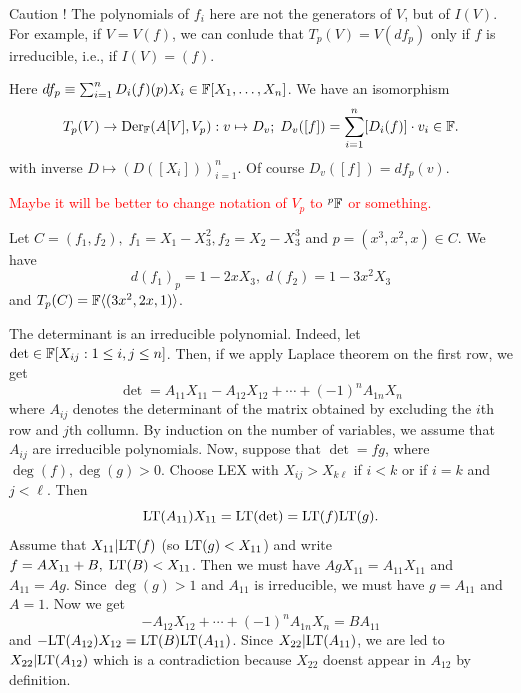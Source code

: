 \begin{itemize}
  \begin{remark}
    Caution ! The polynomials of $f_i$ here are not the generators of $V$, but of $I(V)$. For example, if 
    $V=V(f)$, we can conlude that $T_p(V) = V(df_p)$ only if $f$ is irreducible, i.e., if $I(V)=(f)$.
  \end{remark}
  Here $df_p\equiv \sum_{i=1}^nD_i(f)(p)X_i\in\mathbb{F}[X_1,\dots,X_n]$. We have an isomorphism
  \begin{equation}
    T_p(V)\rightarrow \text{Der}_{\mathbb{F}}(A[V],V_p):v\mapsto D_v;\;D_v([f])=\sum_{i=1}^n[D_i(f)]\cdot v_i\in\mathbb{F}.
  \end{equation}
  with inverse $D\mapsto (D([X_i]))_{i=1}^n$. Of course $D_v([f])=df_p(v)$.
  \begin{center}
    \textcolor{red}{Maybe it will be better to change notation of $V_p$ to $\prescript{p}{}{}\mathbb{F}$ or something.}
  \end{center}
  \begin{example}
    Let $C=(f_1,f_2),\;f_1=X_1-X_3^2, f_2=X_2-X_3^3$ and $p=(x^3,x^2,x)\in C$. We have 
    \begin{equation}
        d(f_1)_p = 1 - 2x X_3,\;d(f_2) = 1 - 3x^2 X_3 
    \end{equation}
    and $T_p(C)=\mathbb{F}\langle(3x^2,2x,1)\rangle$.
  \end{example} 

  \begin{example}
    The determinant is an irreducible polynomial. Indeed, let $\det\in\mathbb{F}[X_{ij}:1\leq i,j\leq n]$. Then, if we apply Laplace theorem
    on the first row, we get 
    \begin{equation}
        \det = A_{11} X_{11} - A_{12}X_{12} +\cdots+(-1)^nA_{1n}X_n
    \end{equation}
    where $A_{ij}$ denotes the determinant of the matrix obtained by excluding the $i$th row and $j$th collumn. By induction on 
    the number of variables, we assume that $A_{ij}$ are irreducible polynomials. Now, suppose that 
    $\det = fg$, where $\deg(f),\deg(g)>0$. Choose LEX with $X_{ij}>X_{k\ell}$ if $i<k$ or if $i=k$ and $j<\ell$. Then 
    \begin{equation}
     \text{LT}(A_{11})X_{11} =  \text{LT}(\det) = \text{LT}(f)\text{LT}(g).
    \end{equation}
    Assume that $X_{11}|\text{LT}(f)$ (so $\text{LT}(g)<X_{11}$) and write $f=AX_{11}+B,\;\text{LT}(B)<X_{11}$. 
    Then we must have $AgX_{11}=A_{11}X_{11}$ and $A_{11}=Ag$. Since $\deg(g)>1$ and $A_{11}$ is irreducible, we must have 
    $g=A_{11}$ and $A=1$. Now we get 
    \begin{equation}
        - A_{12}X_{12} +\cdots+(-1)^nA_{1n}X_n = BA_{11}
    \end{equation}
    and $-\text{LT}(A_{12})X_{12} = \text{LT}(B)\text{LT}(A_{11})$. Since $X_{22}|\text{LT}(A_{11})$, we are led to $X_{22}|\text{LT}(A_{12})$ which is 
    a contradiction because $X_{22}$ doenst appear in $A_{12}$ by definition.\par 


\end{example}
\end{itemize}
